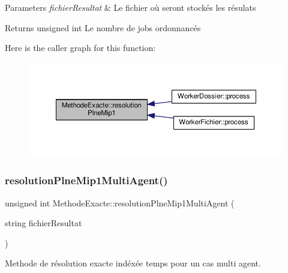 \begin{DoxyParams}{Parameters}
{\em fichier\+Resultat} & Le fichier où seront stockés les résulats \\
\hline
\end{DoxyParams}
\begin{DoxyReturn}{Returns}
unsigned int Le nombre de jobs ordonnancés 
\end{DoxyReturn}
Here is the caller graph for this function\+:\nopagebreak
\begin{figure}[H]
\begin{center}
\leavevmode
\includegraphics[width=350pt]{classMethodeExacte_a91443b3ea749912772b40b5b5c40379e_icgraph}
\end{center}
\end{figure}
\mbox{\label{classMethodeExacte_a3b3d9ad4a6d21f6e3be43212eb706054}} 
\subsubsection{\texorpdfstring{resolution\+Plne\+Mip1\+Multi\+Agent()}{resolutionPlneMip1MultiAgent()}}
{\footnotesize\ttfamily unsigned int Methode\+Exacte\+::resolution\+Plne\+Mip1\+Multi\+Agent (\begin{DoxyParamCaption}\item[{string}]{fichier\+Resultat }\end{DoxyParamCaption})}



Methode de résolution exacte indéxée temps pour un cas multi agent. 


